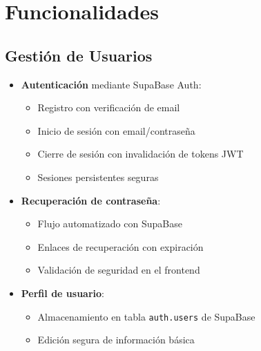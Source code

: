 \section{Funcionalidades}
\subsection{Gestión de Usuarios}
\begin{itemize}
    \item \textbf{Autenticación} mediante SupaBase Auth:
    \begin{itemize}
        \item Registro con verificación de email
        \item Inicio de sesión con email/contraseña
        \item Cierre de sesión con invalidación de tokens JWT
        \item Sesiones persistentes seguras
    \end{itemize}
    
    \item \textbf{Recuperación de contraseña}:
    \begin{itemize}
        \item Flujo automatizado con SupaBase
        \item Enlaces de recuperación con expiración
        \item Validación de seguridad en el frontend
    \end{itemize}
    
    \item \textbf{Perfil de usuario}:
    \begin{itemize}
        \item Almacenamiento en tabla \texttt{auth.users} de SupaBase
        \item Edición segura de información básica
    \end{itemize}
\end{itemize}

